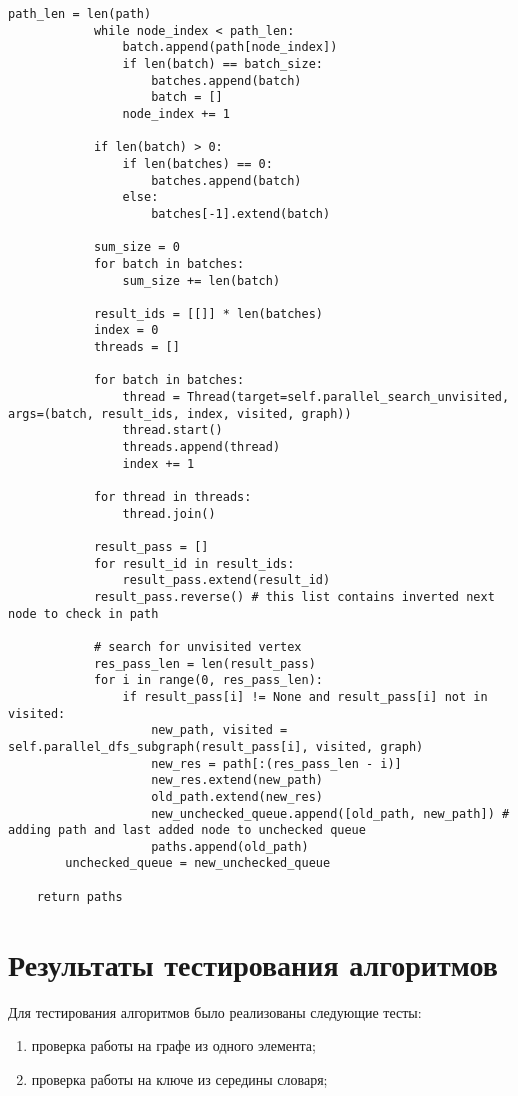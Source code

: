 \begin{lstlisting}[label=some-code-2,caption=Реализация параллельного алгоритма поиска в глубину]
            path_len = len(path)
            while node_index < path_len:
                batch.append(path[node_index])
                if len(batch) == batch_size:
                    batches.append(batch)
                    batch = []
                node_index += 1

            if len(batch) > 0:
                if len(batches) == 0:
                    batches.append(batch)
                else:
                    batches[-1].extend(batch)

            sum_size = 0
            for batch in batches:
                sum_size += len(batch)

            result_ids = [[]] * len(batches)
            index = 0
            threads = []

            for batch in batches:
                thread = Thread(target=self.parallel_search_unvisited, args=(batch, result_ids, index, visited, graph))
                thread.start()
                threads.append(thread)
                index += 1

            for thread in threads:
                thread.join()
            
            result_pass = []
            for result_id in result_ids:
                result_pass.extend(result_id)
            result_pass.reverse() # this list contains inverted next node to check in path

            # search for unvisited vertex
            res_pass_len = len(result_pass)
            for i in range(0, res_pass_len):
                if result_pass[i] != None and result_pass[i] not in visited:
                    new_path, visited = self.parallel_dfs_subgraph(result_pass[i], visited, graph)
                    new_res = path[:(res_pass_len - i)]
                    new_res.extend(new_path)
                    old_path.extend(new_res)
                    new_unchecked_queue.append([old_path, new_path]) # adding path and last added node to unchecked queue
                    paths.append(old_path)
        unchecked_queue = new_unchecked_queue

    return paths
\end{lstlisting}

\section{Результаты тестирования алгоритмов}

Для тестирования алгоритмов было реализованы следующие тесты:
\begin{enumerate}
	\item проверка работы на графе из одного элемента;
	\item проверка работы на ключе из середины словаря;
\end{enumerate}

